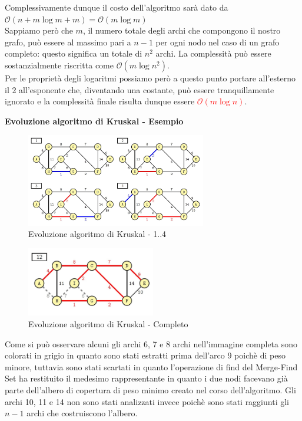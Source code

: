 \documentclass[../cheatSheetAlgoritmi.tex]{subfiles}
\begin{document}
Complessivamente dunque il costo dell'algoritmo sarà dato da $\mathcal{O}(n + m \log m + m) = \mathcal{O}(m \log m)$\\
Sappiamo però che $m$, il numero totale degli archi che compongono il nostro grafo, può essere al massimo pari a $n-1$ per ogni nodo nel caso di un grafo completo: questo significa un totale di $n^{2}$ archi. La complessità può essere sostanzialmente riscritta come $\mathcal{O}(m \log n^{2})$.\\
Per le proprietà degli logaritmi possiamo però a questo punto portare all'esterno il 2 all'esponente che, diventando una costante, può essere tranquillamente ignorato e la complessità finale risulta dunque essere \textcolor{red}{$\mathcal{O}(m \log n)$}.
\newpage
\begin{flushleft}
\textbf{Evoluzione algoritmo di Kruskal - Esempio}
\end{flushleft}
\begin{figure}[h]
	\centering
	\includegraphics[width=0.7\textwidth]{../img/Greedy_7.jpg}
	\caption{Evoluzione algoritmo di Kruskal - 1..4}
\end{figure}
\begin{figure}[h]
	\centering
	\includegraphics[width=0.5\textwidth]{../img/Greedy_8.jpg}
	\caption{Evoluzione algoritmo di Kruskal - Completo}
\end{figure}
Come si può osservare alcuni gli archi 6, 7 e 8 archi nell'immagine completa sono colorati in grigio in quanto sono stati estratti prima dell'arco 9 poichè di peso minore, tuttavia sono stati scartati in quanto l'operazione di find del Merge-Find Set ha restituito il medesimo rappresentante in quanto i due nodi facevano già parte dell'albero di copertura di peso minimo creato nel corso dell'algoritmo. Gli archi 10, 11 e 14 non sono stati analizzati invece poichè sono stati raggiunti gli $n-1$ archi che costruiscono l'albero.
\newpage
\end{document}
